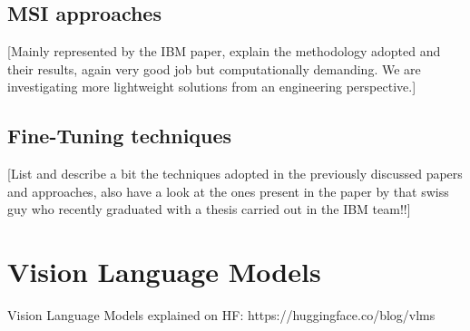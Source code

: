 \documentclass[a4paper, oneside, english]{sapthesis}
\begin{document}
\section{MSI approaches}

[Mainly represented by the IBM paper, explain the methodology adopted and their results, again very good job but computationally demanding. We are investigating more lightweight solutions from an engineering perspective.]


\section{Fine-Tuning techniques}

[List and describe a bit the techniques adopted in the previously discussed papers and approaches, also have a look at the ones present in the paper by that swiss guy who recently graduated with a thesis carried out in the IBM team!!]


\chapter{Vision Language Models}  %
Vision Language Models explained on HF: https://huggingface.co/blog/vlms


\end{document}
